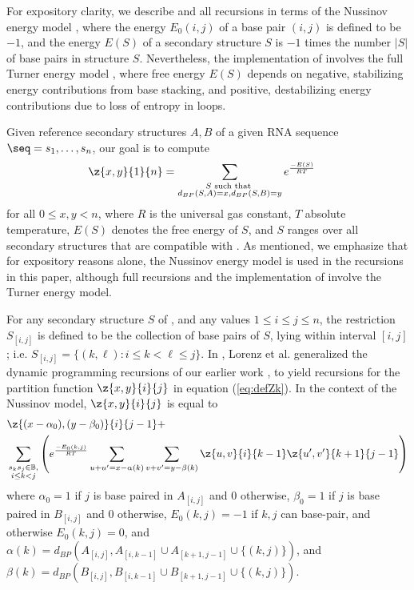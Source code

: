 For expository clarity, we describe \ffttwo and all recursions
in terms of the Nussinov energy model \cite{nussinovJacobson}, where
the energy $E_0(i,j)$ of a base pair $(i,j)$ is defined to be $-1$, and the
energy $E(S)$ of a secondary structure $S$ is $-1$ times the number $|S|$
of base pairs in structure $S$.  Nevertheless, the implementation of
\ffttwo involves the full Turner energy model \cite{xia:RNA}, where
free energy $E(S)$ depends on negative, stabilizing energy contributions
from base stacking, and positive, destabilizing energy contributions due to
loss of entropy in loops.

Given reference secondary structures $A,B$ of a
given RNA sequence $\seq=s_1,\ldots,s_n$, our goal is to compute
\begin{align}
\label{eq:defZk}
\z{x,y}{1}{n} &= \sum_{\substack{S \text{ such that }\\
d_{BP}(S,A)=x, d_{BP}(S,B)=y}} e^{\frac{-E(S)}{RT}}
\end{align}
for all $0\leq x,y < n$, where $R$ is the universal gas constant, $T$
absolute temperature, $E(S)$ denotes the free energy of $S$, and $S$ ranges
over all secondary structures that are compatible with \seq. As mentioned,
we emphasize that for expository reasons alone, the Nussinov energy model is
used in the recursions in this paper, although full recursions and
the implementation of \ffttwo involve the Turner energy model.

For any secondary structure $S$ of \seq, and any values
$1\leq i\leq j \leq n$, the restriction $S_{[i,j]}$ is defined to be the
collection of base pairs of $S$, lying within interval $[i,j]$; i.e.
$S_{[i,j]} = \{ (k,\ell) : i \leq k < \ell \leq j\}$.
In \cite{hofacker:RNAbor2D}, Lorenz et al. generalized
the dynamic programming recursions of our earlier work \cite{Freyhult.b07},
to yield recursions
for the partition function $\z{x,y}{i}{j}$ in equation
(\ref{eq:defZk}).  In the context of the Nussinov model,
$\z{x,y}{i}{j}$ is equal to
\begin{eqnarray}
\label{eq:RNAborNussRecursion}
&\z{(x-\alpha_0),(y-\beta_0)}{i}{j-1} +  \\
&\sum_{\substack{s_k s_j \in \mathbb{B},\\i\le k<j}}
\left(e^{\frac{-E_0(k,j)}{RT}}
\sum_{u+u'=x-\alpha(k)} \sum_{v+v'=y-\beta(k)}
\z{u,v}{i}{k-1}  \z{u',v'}{k+1}{j-1} \right) \nonumber
\end{eqnarray}
where $\alpha_0 = 1$ if $j$ is base paired in $A_{[i,j]}$ and $0$ otherwise,
$\beta_0 = 1$ if $j$ is base paired in $B_{[i,j]}$ and $0$ otherwise,
$E_0(k,j)=-1$ if $k,j$ can base-pair, and otherwise $E_0(k,j)=0$, and
$\alpha(k)=d_{BP}(A_{[i,j]}, A_{[i,k-1]} \cup A_{[k+1,j-1]} \cup\{(k,j)\})$,
and
$\beta(k)=d_{BP}(B_{[i,j]}, B_{[i,k-1]} \cup B_{[k+1,j-1]} \cup\{(k,j)\})$.

